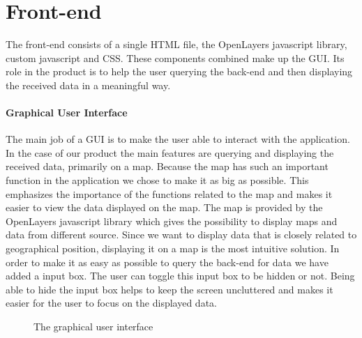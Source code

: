 \documentclass[11pt,a4paper,titlepage,oneside]{report}
\begin{document}
\section{Front-end}
The \gls{front-end} consists of a single \gls{HTML} file, the OpenLayers javascript library, custom javascript and \gls{CSS}. These components combined make up the \gls{GUI}. Its role in the product is to help the user querying the \gls{back-end} and then displaying the received data in a meaningful way. 

\paragraph{Graphical User Interface}
The main job of a \gls{GUI} is to make the user able to interact with the application. In the case of our product the main features are querying and displaying the received data, primarily on a map. Because the map has such an important function in the application we chose to make it as big as possible. This emphasizes the importance of the functions related to the map and makes it easier to view the data displayed on the map. The map is provided by the OpenLayers javascript library which gives the possibility to display maps and data from different source. Since we want to display data that is closely related to geographical position, displaying it on a map is the most intuitive solution. In order to make it as easy as possible to query the \gls{back-end} for data we have added a input box. The user can toggle this input box to be hidden or not. Being able to hide the input box helps to keep the screen uncluttered and makes it easier for the user to focus on the displayed data.

\begin{figure}[!htb]
\begin{center}
\caption{The graphical user interface}
\label{fig:gui}
\end{center}
\end{figure}
\end{document}
